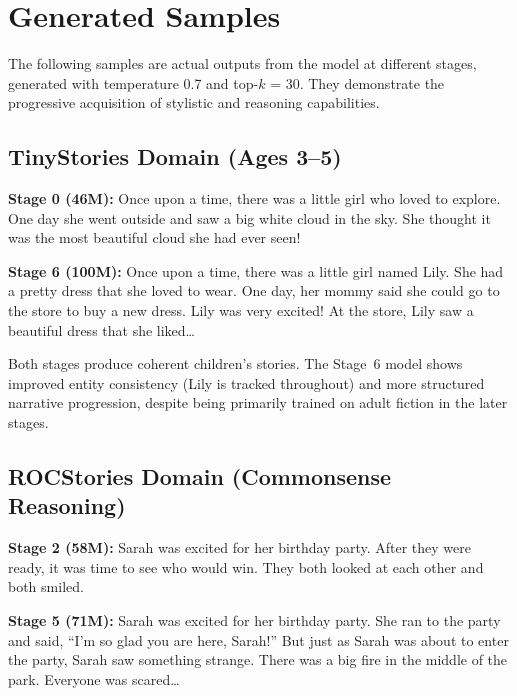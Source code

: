 \section{Generated Samples}

The following samples are actual outputs from the model at different stages,
generated with temperature 0.7 and top-$k$ = 30.  They demonstrate the
progressive acquisition of stylistic and reasoning capabilities.

\subsection{TinyStories Domain (Ages 3--5)}

\begin{samplebox}
\textbf{Stage 0 (46M):}
Once upon a time, there was a little girl who loved to explore. One day she
went outside and saw a big white cloud in the sky. She thought it was the most
beautiful cloud she had ever seen!

\textbf{Stage 6 (100M):}
Once upon a time, there was a little girl named Lily. She had a pretty dress
that she loved to wear. One day, her mommy said she could go to the store to
buy a new dress. Lily was very excited! At the store, Lily saw a beautiful
dress that she liked\ldots
\end{samplebox}

Both stages produce coherent children's stories.  The Stage~6 model shows
improved entity consistency (Lily is tracked throughout) and more structured
narrative progression, despite being primarily trained on adult fiction in the
later stages.

\subsection{ROCStories Domain (Commonsense Reasoning)}

\begin{samplebox}
\textbf{Stage 2 (58M):}
Sarah was excited for her birthday party. After they were ready, it was time
to see who would win. They both looked at each other and both smiled.

\textbf{Stage 5 (71M):}
Sarah was excited for her birthday party. She ran to the party and said,
``I'm so glad you are here, Sarah!'' But just as Sarah was about to enter the
party, Sarah saw something strange. There was a big fire in the middle of the
park. Everyone was scared\ldots
\end{samplebox}

